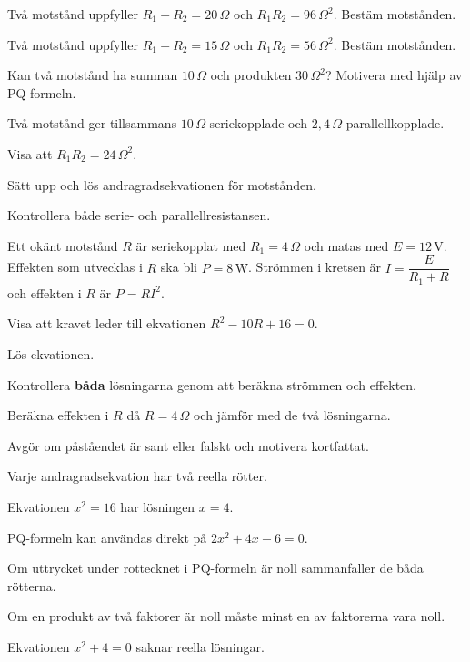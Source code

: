 \begin{parts}
  \item Två motstånd uppfyller $R_1 + R_2 = 20\,\Omega$ och $R_1 R_2 = 96\,\Omega^2$. Bestäm
    motstånden.
  \item Två motstånd uppfyller $R_1 + R_2 = 15\,\Omega$ och $R_1 R_2 = 56\,\Omega^2$. Bestäm
    motstånden.
  \item Kan två motstånd ha summan $10\,\Omega$ och produkten $30\,\Omega^2$? Motivera med
    hjälp av PQ-formeln.
\end{parts}

Två motstånd ger tillsammans $10\,\Omega$ seriekopplade och $2{,}4\,\Omega$ parallellkopplade.
\begin{parts}
  \item Visa att $R_1 R_2 = 24\,\Omega^2$.
  \item Sätt upp och lös andragradsekvationen för motstånden.
  \item Kontrollera både serie- och parallellresistansen.
\end{parts}

Ett okänt motstånd $R$ är seriekopplat med $R_1 = 4\,\Omega$ och matas med $E = 12\,\text{V}$.
Effekten som utvecklas i $R$ ska bli $P = 8\,\text{W}$. Strömmen i kretsen är
$I = \dfrac{E}{R_1 + R}$ och effekten i $R$ är $P = RI^2$.
\begin{parts}
  \item Visa att kravet leder till ekvationen $R^2 - 10R + 16 = 0$.
  \item Lös ekvationen.
  \item Kontrollera \textbf{båda} lösningarna genom att beräkna strömmen och effekten.
  \item Beräkna effekten i $R$ då $R = 4\,\Omega$ och jämför med de två lösningarna.
\end{parts}

Avgör om påståendet är sant eller falskt och motivera kortfattat.
\begin{parts}
  \item Varje andragradsekvation har två reella rötter.
  \item Ekvationen $x^2 = 16$ har lösningen $x = 4$.
  \item PQ-formeln kan användas direkt på $2x^2 + 4x - 6 = 0$.
  \item Om uttrycket under rottecknet i PQ-formeln är noll sammanfaller de båda rötterna.
  \item Om en produkt av två faktorer är noll måste minst en av faktorerna vara noll.
  \item Ekvationen $x^2 + 4 = 0$ saknar reella lösningar.
\end{parts}

